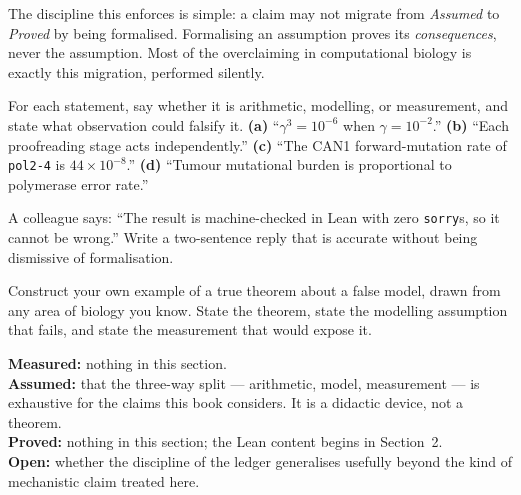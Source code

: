 The discipline this enforces is simple: a claim may not migrate from
\emph{Assumed} to \emph{Proved} by being formalised. Formalising an assumption
proves its \emph{consequences}, never the assumption. Most of the overclaiming
in computational biology is exactly this migration, performed silently.

\begin{exercise}
For each statement, say whether it is arithmetic, modelling, or measurement, and
state what observation could falsify it.
\textbf{(a)} ``$\gamma^3 = 10^{-6}$ when $\gamma = 10^{-2}$.''
\textbf{(b)} ``Each proofreading stage acts independently.''
\textbf{(c)} ``The CAN1 forward-mutation rate of \texttt{pol2-4} is $44\times10^{-8}$.''
\textbf{(d)} ``Tumour mutational burden is proportional to polymerase error rate.''
\end{exercise}

\begin{exercise}
A colleague says: ``The result is machine-checked in Lean with zero \texttt{sorry}s,
so it cannot be wrong.'' Write a two-sentence reply that is accurate without being
dismissive of formalisation.
\end{exercise}

\begin{exercise}
Construct your own example of a true theorem about a false model, drawn from any
area of biology you know. State the theorem, state the modelling assumption that
fails, and state the measurement that would expose it.
\end{exercise}

\begin{ledger}
\textbf{Measured:} nothing in this section. \\
\textbf{Assumed:} that the three-way split --- arithmetic, model, measurement ---
is exhaustive for the claims this book considers. It is a didactic device, not a
theorem. \\
\textbf{Proved:} nothing in this section; the Lean content begins in Section~2. \\
\textbf{Open:} whether the discipline of the ledger generalises usefully beyond
the kind of mechanistic claim treated here.
\end{ledger}
